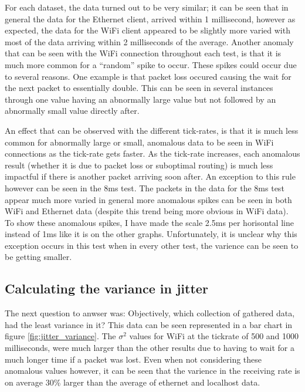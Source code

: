 For each dataset, the data turned out to be very similar; it can be seen that in general the data for the Ethernet client, arrived within 1 millisecond, however as expected, the data for the WiFi client appeared to be slightly more varied with most of the data arriving within 2 milliseconds of the average. Another anomaly that can be seen with the WiFi connection throughout each test, is that it is much more common for a ``random'' spike to occur. These spikes could occur due to several reasons. One example is that packet loss occured causing the wait for the next packet to essentially double. This can be seen in several instances through one value having an abnormally large value but not followed by an abnormally small value directly after.

An effect that can be observed with the different tick-rates, is that it is much less common for abnormally large or small, anomalous data to be seen in WiFi connections as the tick-rate gets faster. As the tick-rate increases, each anomalous result (whether it is due to packet loss or suboptimal routing) is much less impactful if there is another packet arriving soon after. An exception to this rule however can be seen in the 8ms test. The packets in the data for the 8ms test appear much more varied in general more anomalous spikes can be seen in both WiFi and Ethernet data (despite this trend being more obvious in WiFi data). To show these anomalous spikes, I have made the scale 2.5ms per horisontal line instead of 1ms like it is on the other graphs. Unfortunately, it is unclear why this exception occurs in this test when in every other test, the varience can be seen to be getting smaller.

\newpage



\subsection{Calculating the variance in jitter}\label{sec:variance_results}
The next question to anwser was: Objectively, which collection of gathered data, had the least variance in it? This data can be seen represented in a bar chart in figure \ref{fig:jitter_variance}. The $\sigma^2$ values for WiFi at the tickrate of 500 and 1000 milliseconds, were much larger than the other results due to having to wait for a much longer time if a packet was lost. Even when not considering these anomalous values however, it can be seen that the varience in the receiving rate is on average 30\% larger than the average of ethernet and localhost data.

